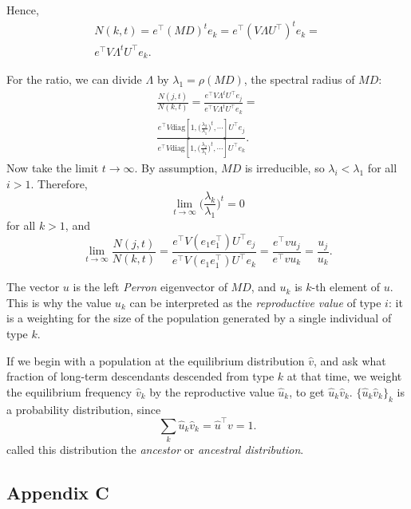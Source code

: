 \documentclass[9pt, a4paper, twocolumn]{extarticle}
\newcommand*{\tr}{^\intercal}
\newcommand{\matrx}[1]{{\left[ \stackrel{}{#1}\right]}}
\newcommand{\diag}[1]{\mbox{diag}\matrx{#1}}
\newcommand{\goesto}{\rightarrow}
\begin{document}
Hence,
\begin{multline}
N(k, t) = 
e\tr (MD)^t e_k =
e\tr  (V \Lambda U\tr)^t e_k = \\
e\tr V \Lambda^t U\tr e_k.
\end{multline}

For the ratio, we can divide $\Lambda$ by $\lambda_1 = \rho(MD)$,
the spectral radius of $MD$:
\begin{multline}
\frac{N(j,t)}{N(k,t)} =
\frac{ e\tr V \Lambda^t U\tr e_j}{ e\tr V \Lambda^t U\tr e_k} = \\
\frac{ e\tr V \diag{1, \Big(\frac{\lambda_2}{\lambda_1}\Big)^t, \cdots} U\tr e_j} { e\tr V \diag{1,\Big(\frac{\lambda_2}{\lambda_1}\Big)^t, \cdots} U\tr e_k}.
\end{multline}
Now take the limit $t \goesto \infty$.
By assumption, $MD$ is irreducible, so $\lambda_i < \lambda_1$ for all $i > 1$.
Therefore,
\begin{equation}
\lim_{t \goesto \infty} \Big( \frac{\lambda_k}{\lambda_1} \Big)^t = 0
\end{equation}
for all $k > 1$, and
\begin{equation}
\lim_{t \goesto \infty}\frac{N(j,t)}{N(k,t)} =
\frac{e\tr V (e_1 e_1\tr) U\tr e_j} { e\tr V (e_1 e_1\tr) U\tr e_k} = 
\frac{ e\tr v u_j} { e\tr v  u_k} =
\frac{u_j} {u_k}.
\end{equation}

The vector $u$ is the left \emph{Perron} eigenvector of $MD$, and $u_k$ is $k$-th element of $u$.
This is why the value $u_k$ can be interpreted as the \emph{reproductive value} of type $i$: it is a weighting for the size of the population generated by a single individual of type $k$.

If we begin with a population at the equilibrium distribution $\hat v$,
and ask what fraction of long-term descendants descended from type $k$ at that time,
we weight the equilibrium frequency $\hat v_k$ by the reproductive value $\hat u_k$, to get $\hat u_k \hat v_k$.
$\{\hat u_k \hat v_k\}_{k}$ is a probability distribution, since
\begin{equation}
\sum_k {\hat u_k \hat v_k} = \hat u\tr v = 1.
\end{equation}
\citet{Hermisson2002} called this distribution the \emph{ancestor} or \emph{ancestral distribution}.

\subsection*{Appendix C}\label{sec:AppC}
\end{document}
